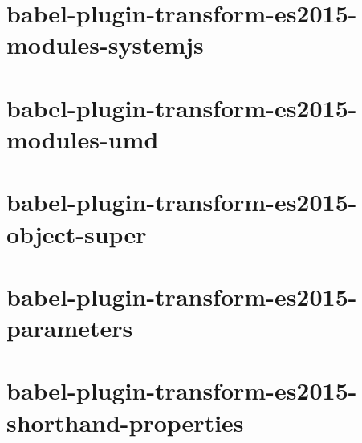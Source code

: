 \documentclass[twoside]{book}
\newcommand{\+}{\discretionary{\mbox{\scriptsize$\hookleftarrow$}}{}{}}
\begin{document}
\chapter{babel-\/plugin-\/transform-\/es2015-\/modules-\/systemjs}
\label{md__c_1_workspace_demo_src_main_script_node_modules_babel-plugin-transform-es2015-modules-systemjs__r_e_a_d_m_e}

\chapter{babel-\/plugin-\/transform-\/es2015-\/modules-\/umd}
\label{md__c_1_workspace_demo_src_main_script_node_modules_babel-plugin-transform-es2015-modules-umd__r_e_a_d_m_e}

\chapter{babel-\/plugin-\/transform-\/es2015-\/object-\/super}
\label{md__c_1_workspace_demo_src_main_script_node_modules_babel-plugin-transform-es2015-object-super__r_e_a_d_m_e}

\chapter{babel-\/plugin-\/transform-\/es2015-\/parameters}
\label{md__c_1_workspace_demo_src_main_script_node_modules_babel-plugin-transform-es2015-parameters__r_e_a_d_m_e}

\chapter{babel-\/plugin-\/transform-\/es2015-\/shorthand-\/properties}
\label{md__c_1_workspace_demo_src_main_script_node_modules_babel-plugin-transform-es2015-shorthand-properties__r_e_a_d_m_e}

\end{document}
